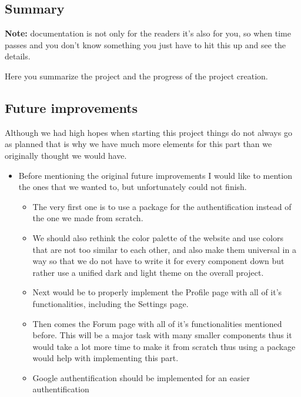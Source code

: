\documentclass[12pt,a4paper]{article}
\begin{document}
\begin{spacing}{1.5}
    \section{Summary}

    \textbf{Note:} documentation is not only for the readers it's also for you, so when time
    passes and you don't know something you just have to hit this up and see the
    details.

    Here you summarize the project and the progress of the project creation.

    \subsection{Future improvements}
    Although we had high hopes when starting this project things do not always go
    as planned that is why we have much more elements for this part than we
    originally thought we would have.
    \begin{itemize}
        \item  Before mentioning the original future improvements I would like to mention the
              ones that we wanted to, but unfortunately could not finish.
              \begin{itemize}
                  \item  The very first one is to use a package for the authentification instead of the
                        one we made from scratch.
                  \item  We should also rethink the color palette of the website and use colors that are
                        not too similar to each other, and also make them universal in a way so that we
                        do not have to write it for every component down but rather use a unified dark
                        and light theme on the overall project. \item  Next would be to properly implement the Profile page with all of it's
                        functionalities, including the Settings page.
                  \item  Then comes the Forum page with all of it's functionalities mentioned before.
                        This will be a major task with many smaller components thus it would take a lot
                        more time to make it from scratch thus using a package would help with
                        implementing this part.
                  \item Google authentification should be implemented for an easier authentification

\end{itemize}
\end{itemize}
\end{spacing}
\end{document}
